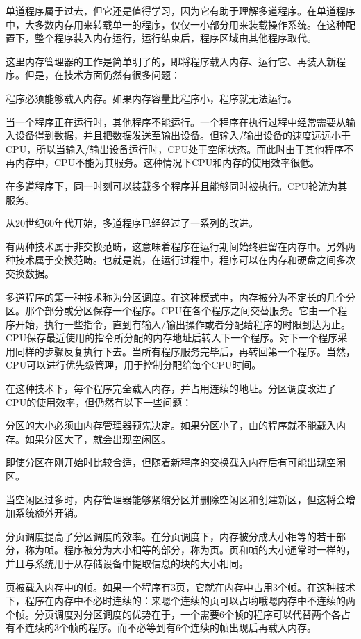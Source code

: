 单道程序属于过去，但它还是值得学习，因为它有助于理解多道程序。在单道程序中，大多数内存用来转载单一的程序，仅仅一小部分用来装载操作系统。在这种配置下，整个程序装入内存运行，运行结束后，程序区域由其他程序取代。

这里内存管理器的工作是简单明了的，即将程序载入内存、运行它、再装入新程序。但是，在技术方面仍然有很多问题：

程序必须能够载入内存。如果内存容量比程序小，程序就无法运行。

当一个程序正在运行时，其他程序不能运行。一个程序在执行过程中经常需要从输入设备得到数据，并且把数据发送至输出设备。但输入/输出设备的速度远远小于CPU，所以当输入/输出设备运行时，CPU处于空闲状态。而此时由于其他程序不再内存中，CPU不能为其服务。这种情况下CPU和内存的使用效率很低。

在多道程序下，同一时刻可以装载多个程序并且能够同时被执行。CPU轮流为其服务。

从20世纪60年代开始，多道程序已经经过了一系列的改进。

有两种技术属于非交换范畴，这意味着程序在运行期间始终驻留在内存中。另外两种技术属于交换范畴。也就是说，在运行过程中，程序可以在内存和硬盘之间多次交换数据。

多道程序的第一种技术称为分区调度。在这种模式中，内存被分为不定长的几个分区。那个部分或分区保存一个程序。CPU在各个程序之间交替服务。它由一个程序开始，执行一些指令，直到有输入/输出操作或者分配给程序的时限到达为止。CPU保存最近使用的指令所分配的内存地址后转入下一个程序。对下一个程序采用同样的步骤反复执行下去。当所有程序服务完毕后，再转回第一个程序。当然，CPU可以进行优先级管理，用于控制分配给每个CPU时间。

在这种技术下，每个程序完全载入内存，并占用连续的地址。分区调度改进了CPU的使用效率，但仍然有以下一些问题：

分区的大小必须由内存管理器预先决定。如果分区小了，由的程序就不能载入内存。如果分区大了，就会出现空闲区。

即使分区在刚开始时比较合适，但随着新程序的交换载入内存后有可能出现空闲区。

当空闲区过多时，内存管理器能够紧缩分区并删除空闲区和创建新区，但这将会增加系统额外开销。

分页调度提高了分区调度的效率。在分页调度下，内存被分成大小相等的若干部分，称为帧。程序被分为大小相等的部分，称为页。页和帧的大小通常时一样的，并且与系统用于从存储设备中提取信息的块的大小相同。

页被载入内存中的帧。如果一个程序有3页，它就在内存中占用3个帧。在这种技术下，程序在内存中不必时连续的：来嗯个连续的页可以占哟哦嗯内存中不连续的两个帧。分页调度对分区调度的优势在于，一个需要6个帧的程序可以代替两个各占有不连续的3个帧的程序。而不必等到有6个连续的帧出现后再载入内存。

